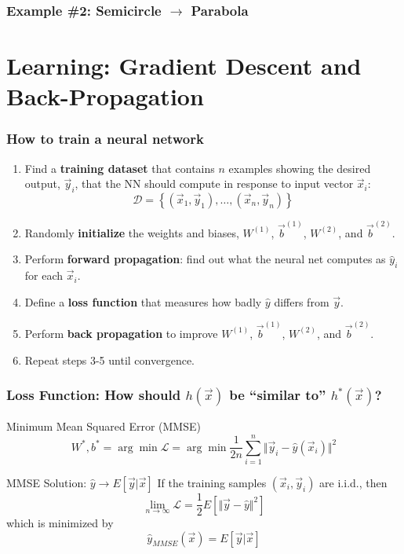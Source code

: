 \documentclass{beamer}
\begin{document}
\begin{frame}
  \frametitle{Example \#2: Semicircle $\rightarrow$ Parabola}

  \centerline{}
\end{frame}

\section[Learning]{Learning: Gradient Descent  and Back-Propagation}
\setcounter{subsection}{1}

\begin{frame}
  \frametitle{How to train a neural network}
  \begin{enumerate}
  \item Find a {\bf training dataset} that contains $n$ examples showing the
    desired output, $\vec{y}_i$, that the NN should compute in
    response to input vector $\vec{x}_i$:
    \[
    {\mathcal D}=\left\{(\vec{x}_1,\vec{y}_1),\ldots,(\vec{x}_n,\vec{y}_n)\right\}
    \]
    \item Randomly {\bf initialize} the weights and biases, $W^{(1)}$,
      $\vec{b}^{(1)}$, $W^{(2)}$, and $\vec{b}^{(2)}$.
    \item Perform {\bf forward propagation}: find out what the neural
      net computes as $\hat{y}_i$ for each $\vec{x}_i$.
    \item Define a {\bf loss function} that measures
      how badly $\hat{y}$ differs from $\vec{y}$.
    \item Perform {\bf back propagation} to improve  $W^{(1)}$,
      $\vec{b}^{(1)}$, $W^{(2)}$, and $\vec{b}^{(2)}$.
    \item Repeat steps 3-5 until convergence.
  \end{enumerate}
\end{frame}

\begin{frame}
  \frametitle{Loss Function: How should $h(\vec{x})$ be
    ``similar to'' $h^*(\vec{x})$?}
  \begin{block}{Minimum Mean Squared Error (MMSE)}
    \[
    W^*,b^*=\arg\min {\mathcal L} = \arg\min\frac{1}{2n}\sum_{i=1}^n
    \Vert\vec{y}_{i}-\hat{y}(\vec{x}_i)\Vert^2
    \]
  \end{block}
  \begin{block}{MMSE Solution: $\hat{y}\rightarrow E\left[\vec{y}|\vec{x}\right]$}
    If the training samples $(\vec{x}_i,\vec{y}_i)$ are i.i.d., then
    \[
    \lim_{n\rightarrow\infty}{\mathcal L} = \frac{1}{2}E\left[\Vert\vec{y}-\hat{y}\Vert^2\right]
    \]
    which is minimized by
    \[
    \hat{y}_{MMSE}(\vec{x})=E\left[\vec{y}|\vec{x}\right]
    \]
  \end{block}
\end{frame}
\end{document}
